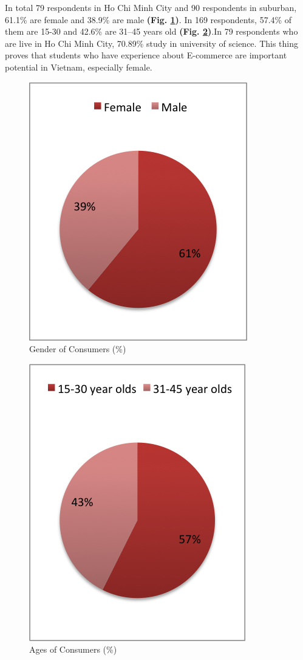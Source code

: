 \documentclass[conference]{IEEEtran}
\begin{document}
In total 79 respondents in Ho Chi Minh City and 90 respondents in suburban, 61.1\% are female and 38.9\% are male \textbf{(Fig. \ref{fig:genderofconsumers})}. In 169 respondents, 57.4\% of them are 15-30 and 42.6\% are 31–45 years old \textbf{(Fig. \ref{fig:agesofconsumers})}.In 79 respondents who are live in Ho Chi Minh City,  70.89\% study in university of science. This thing proves that students who have experience about E-commerce are important potential in Vietnam, especially female. 

\begin{figure}[h]
\centering
\includegraphics[width=0.7\linewidth]{./genderofconsumers}
\caption{Gender of Consumers (\%)}
\label{fig:genderofconsumers}
\end{figure}

\begin{figure}[h]
\centering
\includegraphics[width=0.7\linewidth]{./age}
\caption{Ages of Consumers (\%)}
\label{fig:agesofconsumers}
\end{figure}
\end{document}
